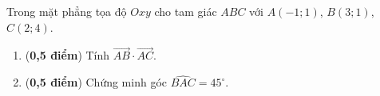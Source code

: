 \begin{bt}%
	Trong mặt phẳng tọa độ $Oxy$ cho tam giác $ABC$ với $A(-1;1)$, $B(3;1)$, $C(2;4)$.
	\begin{enumerate}
		\item (\textbf{0,5 điểm}) Tính $\overrightarrow{AB}\cdot \overrightarrow{AC}$.
		\item (\textbf{0,5 điểm})  Chứng minh góc $\widehat{BAC}=45^\circ$.
\end{enumerate}
\end{bt}

